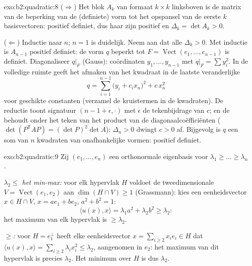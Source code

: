 \begin{solution}{exo:b2:quadratic:8}
($\Rightarrow$) Het blok $A_k$ van formaat $k \times k$ linksboven
is de matrix van de beperking van de (definiete) vorm tot het
opspansel van de eerste $k$ basisvectoren: positief definiet, dus
haar  zijn positief en $\Delta_k = \det A_k > 0$.

($\Leftarrow$) Inductie naar $n$; $n = 1$ is duidelijk. Neem aan
dat alle $\Delta_k > 0$. Met inductie is $A_{n-1}$ positief
definiet: de vorm $q$ beperkt tot $F = \operatorname{Vect}(e_1,
\dots, e_{n-1})$ is definiet. Diagonaliseer $q|_F$ (Gauss):
coördinaten $y_1, \dots, y_{n-1}$ met $q|_F = \sum y_i^2$. In de
volledige ruimte geeft het afmaken van het kwadraat in de laatste
veranderlijke
\[
q = \sum_{i=1}^{n-1} \bigl(y_i + c_i x_n\bigr)^2 + c\,x_n^2
\]
voor geschikte constanten (verzamel de kruistermen in de
kwadraten). De reductie toont signatuur $(n-1 + \epsilon, \cdot)$
met $\epsilon$ de tekenbijdrage van $c$; en de  behoudt
onder  het teken van het product van de
diagonaalcoëfficiënten ($\det(P^{\mathsf T}AP) = (\det P)^2\det A$):
$\Delta_n > 0$ dwingt $c > 0$ af. Bijgevolg is $q$ een som van $n$
kwadraten van onafhankelijke vormen: positief definiet.
\end{solution}

\begin{solution}{exo:b2:quadratic:9}
Zij $(e_1, \dots, e_n)$ een orthonormale eigenbasis voor $\lambda_1
\geq \dots \geq \lambda_n$.

\emph{$\lambda_2 \leq$ het min-max:} voor elk hypervlak $H$ voldoet
de tweedimensionale $V = \operatorname{Vect}(e_1, e_2)$ aan
$\dim(H \cap V) \geq 1$ (Grassmann): kies een eenheidsvector $x \in
H \cap V$, $x = ae_1 + be_2$, $a^2 + b^2 = 1$:
\[
\langle u(x), x\rangle = \lambda_1 a^2 + \lambda_2 b^2 \geq
\lambda_2 :
\]
het maximum van elk hypervlak is $\geq \lambda_2$.

\emph{$\geq$:} voor $H = e_1^{\perp}$ heeft elke eenheidsvector $x
= \sum_{i\geq2} x_ie_i \in H$ dat $\langle u(x), x\rangle =
\sum_{i \geq 2} \lambda_i x_i^2 \leq \lambda_2$, aangenomen in
$e_2$: het maximum van dit hypervlak is precies $\lambda_2$. Het
minimum over $H$ is dus $\lambda_2$.
\end{solution}

